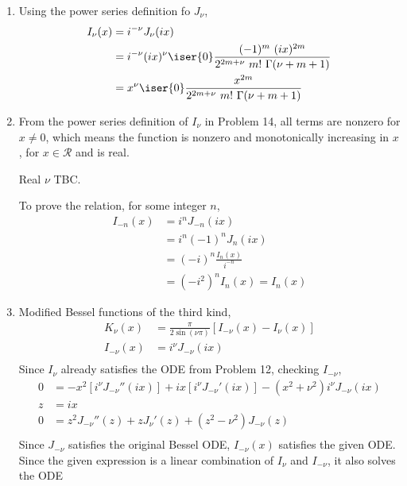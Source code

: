 \begin{enumerate}
    \item Using the power series definition fo $ J_\nu $,
          \begin{align}
              I_\nu(x) & = i^{-\nu}J_\nu(ix)                                  \\
                       & = i^{-\nu}(ix)^\nu \iser{0} \frac{(-1)^m\ (ix)^{2m}}
              {2^{2m + \nu}\ m!\ \Gamma(\nu + m + 1)}                         \\
                       & = x^{\nu} \iser{0} \frac{x^{2m}}
              {2^{2m + \nu}\ m!\ \Gamma(\nu + m + 1)}
          \end{align}

    \item From the power series definition of $ I_\nu $ in Problem 14, all terms are
          nonzero for $ x \neq 0 $, which means the function is nonzero and monotonically
          increasing in $ x $, for $ x \in \mathcal{R} $ and is real. \par
          Real $ \nu $ TBC. \par
          To prove the relation, for some integer $ n $,
          \begin{align}
              I_{-n}(x) & = i^{n} J_{-n}(ix)             \\
                        & = i^{n} (-1)^n J_n(ix)         \\
                        & = (-i)^n \frac{I_n(x)}{i^{-n}} \\
                        & = (-i^2)^n I_n(x) = I_n(x)
          \end{align}

    \item Modified Bessel functions of the third kind,
          \begin{align}
              K_\nu(x)    & = \frac{\pi}{2\sin(\nu \pi)} [I_{-\nu}(x) - I_\nu(x)] \\
              I_{-\nu}(x) & = i^{\nu} J_{-\nu}(ix)                                \\
          \end{align}
          Since $ I_\nu $ already satisfies the ODE from Problem 12, checking
          $ I_{-\nu} $,
          \begin{align}
              0 & = -x^2 [i^{\nu} J_{-\nu}''(ix)] + ix [i^{\nu}J_{-\nu}'(ix)] -
              (x^2 + \nu^2) i^{\nu} J_{-\nu}(ix)                               \\
               z & = ix \\
               0 & = z^2 J_{-\nu}''(z) + z J_{\nu}'(z) + (z^2 - \nu^2)J_{-\nu}(z) \\
          \end{align}
          Since $ J_{-\nu} $ satisfies the original Bessel ODE, $I_{-\nu}(x)$
          satisfies the given ODE. Since the given expression is a linear combination of
          $ I_{\nu} $ and $ I_{-\nu} $, it also solves the ODE
\end{enumerate}